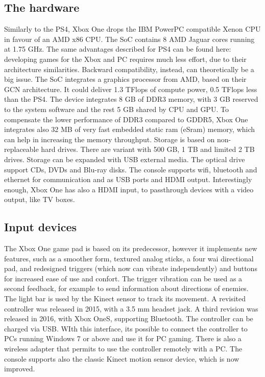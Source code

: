\documentclass[a4paper,10pt]{book}
\begin{document}
 \subsection{ The hardware  }
  Similarly to the PS4, Xbox One drops the IBM PowerPC compatible Xenon CPU in favour of an AMD x86 CPU. The SoC contains 8 AMD Jaguar cores running at 1.75 GHz.  
  The same advantages described for PS4 can be found here: developing games for the Xbox and PC requires much less effort, due to their architecture similarities. Backward compatibility, instead, can theoretically be a big issue.  
  The SoC integrates a graphics processor from AMD, based on their GCN architecture. It could deliver 1.3 TFlops of compute power, 0.5 TFlops less than the PS4.  
  The device integrates 8 GB of DDR3 memory, with 3 GB reserved to the system software and the rest 5 GB shared by CPU and GPU. To compensate the lower performance of DDR3 compared to GDDR5, Xbox One integrates also 32 MB of very fast embedded static ram (eSram) memory, which can help in increasing the memory throughput.  
  Storage is based on non-replaceable hard drives. There are variant with 500 GB, 1 TB and limited 2 TB drives. Storage can be expanded with USB external media. The optical drive support CDs, DVDs and Blu-ray disks.  
  The console supports wifi, bluetooth and ethernet for communication and as USB ports and HDMI output. Interestingly enough, Xbox One has also a HDMI input, to passthrough devices with a video output, like TV boxes.  
 \subsection{ Input devices  }
  The Xbox One game pad is based on its predecessor, however it implements new features, such as a smoother form, textured analog sticks, a four wai directional pad, and redesigned triggers (which now can vibrate independently) and buttons for increased ease of use and confort. The trigger vibration can be used as a second feedback, for example to send information about directions of enemies. The light bar is used by the Kinect sensor to track its movement.  
  A revisited controller was released in 2015, with a 3.5 mm headset jack. A third revision was released in 2016, with Xbox OneS, supporting Bluetooth.  
  The controller can be charged via USB. WIth this interface, its possible to connect the controller to PCs running Windows 7 or above and use it for PC gaming. There is also a wireless adapter that permits to use the controller remotely with a PC.  
  The console supports also the classic Kinect motion sensor device, which is now improved.  
\end{document}
